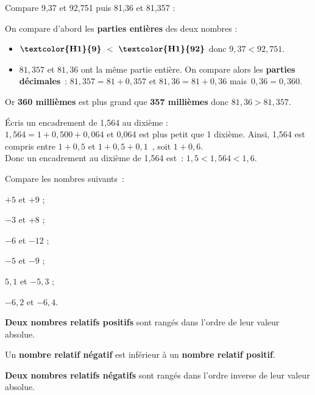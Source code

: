 \begin{methode*1}


\begin{exemple*1}
Compare 9,37 et 92,751 puis 81,36 et 81,357 :

On compare d'abord les \textbf{\textcolor{H1}{parties entières}} des deux nombres :
\begin{itemize}
 \item $\textbf{\textcolor{H1}{9}} < \textbf{\textcolor{H1}{92}}$ donc $9,37 < 92,751$.
 \item $81,357$ et $81,36$ ont la même partie entière. On compare alors les \textbf{\textcolor{B2}{parties décimales}} : $81,357 = 81+0,357$ et $81,36=81+0,36$ mais $0,36=0,360$.
 \end{itemize}
Or \textbf{\textcolor{B2}{360 millièmes}} est plus grand que \textbf{\textcolor{B2}{357 millièmes}} donc $81,36 > 81,357$.
\end{exemple*1}


\begin{exemple*1}
Écris un encadrement de 1,564 au dixième : \\[0.5em]
$1,564 = 1 + 0,500 + 0,064$ et 0,064 est plus petit que 1 dixième. Ainsi, 1,564 est compris entre $1 + 0,5$ et $1 + 0,5 + 0,1$ , soit $1 + 0,6$. \\[0.5em]
Donc un encadrement au dixième de 1,564 est : $1,5 < 1,564 < 1,6$.
\end{exemple*1}

\exercice
Compare les nombres suivants :
\begin{colenumerate}{3}
 \item $+5$ et $+9$ ;
 \item $-3$ et $+8$ ;
 \item $-6$ et $-12$ ;
 \item $-5$ et $-9$ ;
 \item $5,1$ et $-5,3$ ;
 \item $-6,2$ et $-6,4$.
 \end{colenumerate}

\end{methode*1}


\newpage

\begin{aconnaitre}
\textbf{Deux nombres relatifs positifs} sont rangés dans l'ordre de leur valeur absolue.

Un \textbf{nombre relatif négatif} est inférieur à un \textbf{nombre relatif positif}.

\textbf{Deux nombres relatifs négatifs} sont rangés dans l'ordre inverse de leur valeur absolue.
\end{aconnaitre}

